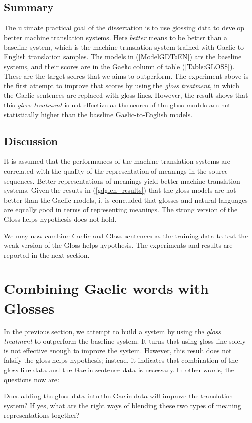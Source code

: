 \documentclass[a4paper]{article}
\begin{document}
\subsection{Summary}
The ultimate practical goal of the dissertation is to use glossing data to develop better machine translation systems. Here \textit{better} means to be better than a baseline system, which is the machine translation system trained with Gaelic-to-English translation samples. The models in (\ref{ModelGDToEN}) are the baseline systems, and their scores are in the Gaelic column of table (\ref{Table:GLOSS}). These are the target scores that we aims to outperform. The experiment above is the first attempt to improve that scores by using the \textit{gloss treatment}, in which the Gaelic sentences are replaced with gloss lines.  However, the result shows that this \textit{gloss treatment} is not effective as the scores of the gloss models are not statistically higher than the baseline Gaelic-to-English models.  

\subsection{Discussion}
It is assumed that the performances of the machine translation systems are correlated with the quality of the representation of meanings in the source sequences. Better representations of meanings yield better machine translation systems. Given the results in (\ref{gdglen_results}) that the gloss models are not better than the Gaelic models, it is concluded that glosses and natural languages are equally good in terms of representing meanings. The strong version of the Gloss-helps hypothesis does not hold. 

We may now combine Gaelic and Gloss sentences as the training data to test the weak version of the Gloss-helps hypothesis. The experiments and results are reported in the next section. 

\section{Combining Gaelic words with Glosses}\label{gd_plus_gl_to_en}

In the previous section, we attempt to build a system by using the \textit{gloss treatment} to outperform the baseline system. It turns that using gloss line solely is not effective enough to improve the system. However, this result does not falsify the gloss-helps hypothesis; instead, it indicates that combination of the gloss line data and the Gaelic sentence data is necessary. In other words, the questions now are: 
\begin{exe}
	\ex 
	\begin{xlist}
		\ex Does adding the gloss data into the Gaelic data will improve the translation system? 
		\ex If yes, what are the right ways of blending these two types of meaning representations together? 
	\end{xlist}	
\end{exe}
\end{document}
